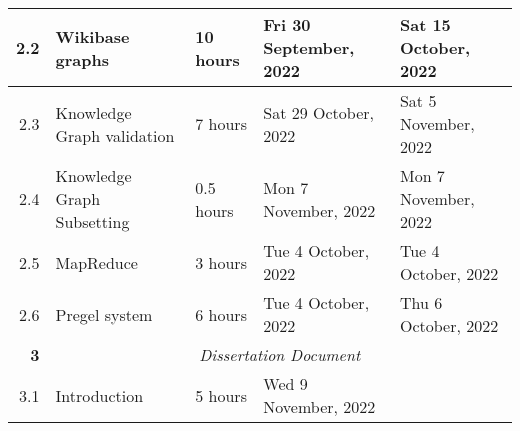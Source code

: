 \documentclass{standalone}
\begin{document}
\begin{tabular}{|r|llll|}
    2.2                                                           & \multicolumn{1}{l|}{Wikibase graphs}                            & \multicolumn{1}{l|}{10 hours}                                  & \multicolumn{1}{l|}{Fri 30 September, 2022}                 & Sat 15 October, 2022                                         \\ \hline
    2.3                                                           & \multicolumn{1}{l|}{Knowledge Graph validation}                 & \multicolumn{1}{l|}{7 hours}                                   & \multicolumn{1}{l|}{Sat 29 October, 2022}                   & Sat 5 November, 2022                                         \\ \hline
    2.4                                                           & \multicolumn{1}{l|}{Knowledge Graph Subsetting}                 & \multicolumn{1}{l|}{0.5 hours}                                 & \multicolumn{1}{l|}{Mon 7 November, 2022}                   & Mon 7 November, 2022                                         \\ \hline
    2.5                                                           & \multicolumn{1}{l|}{MapReduce}                                  & \multicolumn{1}{l|}{3 hours}                                   & \multicolumn{1}{l|}{Tue 4 October, 2022}                    & Tue 4 October, 2022                                          \\ \hline
    2.6                                                           & \multicolumn{1}{l|}{Pregel system}                              & \multicolumn{1}{l|}{6 hours}                                   & \multicolumn{1}{l|}{Tue 4 October, 2022}                    & Thu 6 October, 2022                                          \\ \hline
    \textbf{3}                                                    & \multicolumn{4}{c|}{\textit{Dissertation Document}}                                                                                                                                                                                                           \\ \hline
    3.1                                                           & \multicolumn{1}{l|}{Introduction}                               & \multicolumn{1}{l|}{5 hours}                                   & \multicolumn{1}{l|}{Wed 9 November, 2022}                   &                                                              \\ \hline

\end{tabular}
\end{document}
